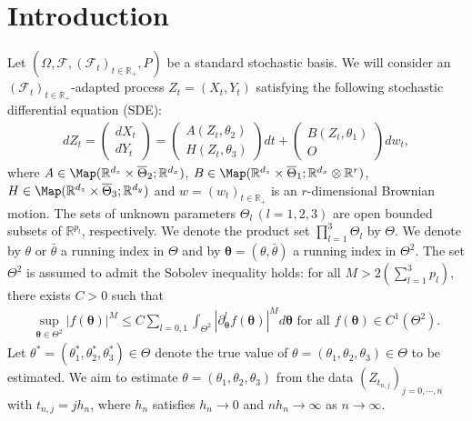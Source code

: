 \documentclass[a4paper,11pt]{jsarticle}
\begin{document}
\section{Introduction}
Let $(\Omega,\mathcal{F},(\mathcal{F}_t)_{t\in \mathbb{R}_+ } ,P)$ be a standard stochastic basis. We will consider an $(\mathcal{F}_t)_{t\in \mathbb{R}_+ }$-adapted process $Z_t = (X_t,Y_t)$ satisfying the following stochastic differential equation (SDE):
\begin{align} \label{eq}
    dZ_t = \begin{pmatrix}
        dX_t \\ d Y_t
    \end{pmatrix} = \begin{pmatrix}
        A(Z_t,\theta_2) \\ H(Z_t,\theta_3)
    \end{pmatrix}dt + \begin{pmatrix}
        B(Z_t, \theta_1)\\O
    \end{pmatrix}dw_t,
\end{align}
where $A \in \Map(\mathbb{R}^{d_z} \times \overline{\Theta}_2; \mathbb{R}^{d_x})$, $B \in \Map(\mathbb{R}^{d_z}\times \overline{\Theta}_1 ; \mathbb{R}^{d_x} \otimes \mathbb{R}^r )$, $H\in \Map(\mathbb{R}^{d_z} \times \overline{\Theta}_3; \mathbb{R}^{d_y})$ and $w = (w_t)_{t\in \mathbb{R}_+ }$ is an $r$-dimensional Brownian motion. The sets of unknown parameters ${\Theta}_l \,(l =1,2,3)$ are open bounded subsets of $\mathbb{R}^{p_l}$, respectively. We denote the product set $\prod_{l=1}^3 \Theta_l $ by $\Theta$. We denote by $\theta$ or $\bar{\theta}$ a running index in $\Theta$ and by $\boldsymbol{\theta}=(\theta,\bar{\theta})$ a running index in $\Theta^2$. The set $\Theta^2$ is assumed to admit the Sobolev inequality holds: for all $M > 2(\sum_{l=1}^3 p_l) $, there exists $C>0$ such that
\begin{align}
 \sup_{ \boldsymbol{\theta} \in \Theta^2}|f (\boldsymbol{\theta}) |^{M} \leq C\sum_{l =0,1} \int_{\Theta^2}|\partial_ {\boldsymbol{\theta}}^l
 f(\boldsymbol{\theta})|^{M} d\boldsymbol{\theta}  \text{  for all $f(\boldsymbol{\theta}) \in C^1(\Theta^2)$.}
\end{align}Let $\theta^* = (\theta_1^*,\theta_2^*,\theta_3^*) \in \Theta$ denote the true value of $\theta = (\theta_1,\theta_2,\theta_3) \in \Theta$ to be estimated. We aim to estimate $\theta = (\theta_1,\theta_2,\theta_3)$ from the data $(Z_{t_{n,j} })_{j =0,\cdots,n}$ with $t_{n,j} = jh_n$, where $h_n$ satisfies $h_n  \to 0$ and $nh_n \to \infty$ as $n \to \infty$.  
\end{document}
